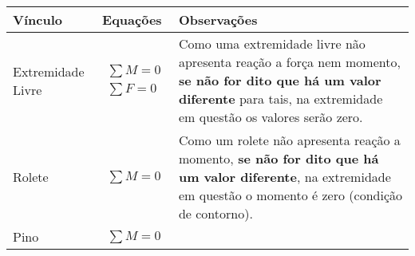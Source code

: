 \documentclass{article}
\begin{document}
            \begin{table}[h]
                \tiny
                \centering
            \begin{tabularx}{\textwidth}{|X|X|X|}\hline
                    \textbf{Vínculo} & \textbf{Equações} & \textbf{Observações} \\ \hline
                    Extremidade Livre  & 
                        \begin{minipage}{.3\textwidth}
                            \begin{align*}
                                \sum M = 0 \\ 
                                \sum F = 0
                            \end{align*}
                        \end{minipage} &
                        
                        \begin{minipage}{.3\textwidth}
                            \vspace{5px}
                            Como uma extremidade livre não apresenta reação a força nem momento, \textbf{se não for dito que há um valor diferente} para tais, na extremidade em questão os valores serão zero.
                        \end{minipage} \\ \hline

                    Rolete & 
                        \begin{minipage}{.3\textwidth}
                            \begin{align*}
                                \sum M = 0
                            \end{align*}
                        \end{minipage} &
                        
                        \begin{minipage}{.3\textwidth}
                            \vspace{5px}
                            Como um rolete não apresenta reação a momento, \textbf{se não for dito que há um valor diferente}, na extremidade em questão  o momento é zero (condição de contorno).
                        \end{minipage} \\ \hline                       

                    Pino & 
                        \begin{minipage}{.3\textwidth}
                            \begin{align*}
                                \sum M = 0
                            \end{align*}
                        \end{minipage} &
                        

\end{tabularx}
\end{table}
\end{document}
